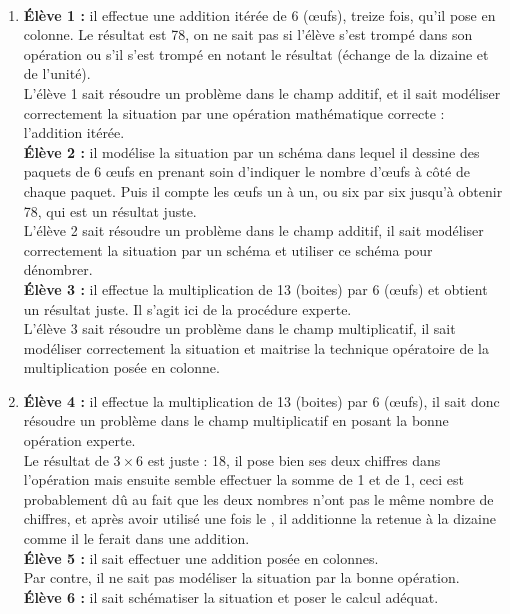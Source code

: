 \ \\ [-5mm]
\begin{enumerate}
   \item {\bf Élève 1 : } il effectue une addition itérée de 6 (\oe ufs), treize fois, qu'il pose en colonne. Le résultat est 78, on ne sait pas si l'élève s'est trompé dans son opération ou s'il s'est trompé en notant le résultat (échange de la dizaine et de l'unité). \\
   L'élève 1 sait résoudre un problème dans le champ additif, et il sait modéliser correctement la situation par une opération mathématique correcte : l'addition itérée. \\
   {\bf Élève 2 : } il modélise la situation par un schéma dans lequel il dessine des paquets de 6 \oe ufs en prenant soin d'indiquer le nombre d'\oe ufs à côté de chaque paquet. Puis il compte les \oe ufs un à un, ou six par six jusqu'à obtenir 78, qui est un résultat juste. \\
   L'élève 2 sait résoudre un problème dans le champ additif, il sait modéliser correctement la situation par un schéma et utiliser ce schéma pour dénombrer. \\
   {\bf Élève 3 : } il effectue la multiplication de 13 (boites) par 6 (\oe ufs) et obtient un résultat juste. Il s'agit ici de la procédure experte. \\
   L'élève 3 sait résoudre un problème dans le champ multiplicatif, il sait modéliser correctement la situation et maitrise la technique opératoire de la multiplication posée en colonne. \\
   \item {\bf Élève 4 : } il effectue la multiplication de 13 (boites) par 6 (\oe ufs), il sait donc résoudre un problème dans le champ multiplicatif en posant la bonne opération experte. \\
   Le résultat de $3\times6$ est juste : 18, il pose bien ses deux chiffres dans l'opération mais ensuite semble effectuer la somme de 1 et de 1, ceci est probablement dû au fait que les deux nombres n'ont pas le même nombre de chiffres, et après avoir utilisé une fois le  \fg{}, il additionne la retenue à la dizaine comme il le ferait dans une addition. \\
   {\bf Élève 5 : } il sait effectuer une addition posée en colonnes. \\
   Par contre, il ne sait pas modéliser la situation par la bonne opération. \\
   {\bf Élève 6 : } il sait schématiser la situation et poser le calcul adéquat. \\

\end{enumerate}
